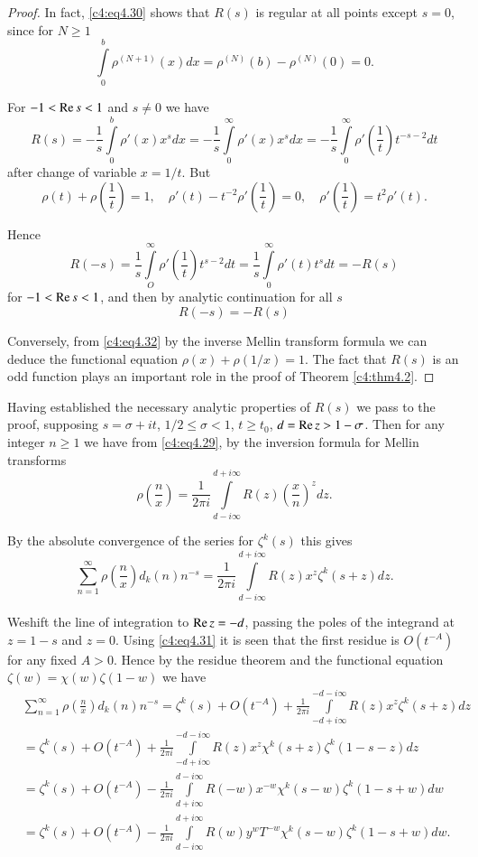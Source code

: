 \begin{proof}
In fact, \eqref{c4:eq4.30} shows that $R(s)$ is regular at all points
except $s=0$, since for $N \geq 1$
$$
\int\limits_0^b \rho^{(N+1)}(x) dx= \rho^{(N)}(b) - \rho^{(N)}(0) =0.
$$

For $-1 < \operatorname{Re} s < 1$ and $s \neq 0$ we have
$$
R(s) =- \frac{1}{s} \int\limits_0^b \rho'(x) x^s dx = -\frac{1}{s}
\int\limits_0^\infty \rho' (x) x^s dx = -\frac{1}{s}
\int\limits_0^\infty \rho' \left(\frac{1}{t}\right)t^{-s-2}dt
$$
after change of variable $x=1/t$. But
$$
\rho(t) + \rho \left(\frac{1}{t} \right) = 1,\quad \rho' (t) - t^{-2} \rho'
\left(\frac{1}{t} \right)=0,\quad \rho' \left(\frac{1}{t} \right) = t^2
\rho' (t).
$$

Hence 
$$
R(-s) = \frac{1}{s} \int\limits_O^\infty \rho' \left(\frac{1}{t}
\right) t^{s-2} dt = \frac{1}{s} \int\limits_0^\infty \rho' (t) t^s dt
= -R(s)
$$
for $-1 < \operatorname{Re} s< 1$, and then by analytic continuation for all $s$
\begin{equation}
  R(-s) = -R (s) \label{c4:eq4.32}
\end{equation}

Conversely, from \eqref{c4:eq4.32} by the inverse Mellin transform
formula we can deduce the functional equation $\rho (x) + \rho
(1/x)=1$. The fact that $R(s)$ is an odd function plays an important
role in the proof of Theorem \ref{c4:thm4.2}. 
\end{proof}


Having established the necessary analytic properties of $R(s)$ we pass
to the proof, supposing $s= \sigma+ it$, $1/2 \leq \sigma < 1$, $t
\geq t_0$, $d = \operatorname{Re} z > 1- \sigma$. Then for any integer $n \geq 1$ we
have from \eqref{c4:eq4.29}, by the inversion formula for Mellin
transforms
$$
\rho \left( \frac{n}{x}\right)= \frac{1}{2 \pi i} \int\limits_{d- i
  \infty}^{d+ i \infty} R(z) \left(\frac{x}{n} \right)^z dz.
$$ 

By the absolute convergence of the series for $\zeta^k(s)$ this gives
$$
\sum_{n=1}^\infty \rho\left(\frac{n}{x} \right)d_k (n) n^{-s} =
\frac{1}{2\pi i} \int\limits_{d- i \infty}^{d+ i \infty} R(z) x^z
\zeta^k (s+ z)dz.
$$

We\pageoriginale shift the line of integration to $\operatorname{Re} z =- d$, passing the poles of
the integrand at $z=1-s$ and $z=0$. Using \eqref{c4:eq4.31} it is seen
that the first residue is $O(t^{-A})$ for any fixed $A >0$. Hence by
the residue theorem and the functional equation $\zeta (w) = \chi (w)
\zeta (1-w)$ we have
\begin{align*}
  & \sum_{n=1}^\infty \rho\left(\frac{n}{x} \right)d_k (n) n^{-s} =
  \zeta^k (s) + O(t^{-A}) + \frac{1}{2 \pi i} \int\limits_{-d+i
    \infty}^{-d - i \infty} R(z) x^{z} \zeta^k (s+z) dz\\
  & = \zeta^k (s) + O(t^{-A}) + \frac{1}{2 \pi i} \int\limits_{-d + i
    \infty}^{-d - i \infty} R(z) x^{z}\chi^k (s+z) \zeta^k (1- s
  -z)dz\\
  & = \zeta^k (s) + O(t^{-A}) - \frac{1}{2 \pi i} \int\limits_{d+ i
    \infty}^{d- i \infty} R(-w) x^{-w} \chi^k (s-w) \zeta^k (1-
  s+w)dw\\
 & = \zeta^k (s) + O(t^{-A})- \frac{1}{2 \pi i} \int\limits_{d- i
    \infty}^{d+ i \infty} R(w) y^w T^{-w} \chi^k (s-w) \zeta^k (1-
  s+w) dw.
\end{align*}


